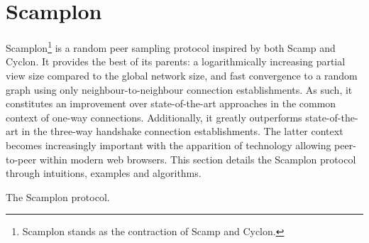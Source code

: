 
\section{Scamplon}
\label{sec:proposal}

Scamplon\footnote{Scamplon stands as the contraction of Scamp and Cyclon.} is a
random peer sampling protocol inspired by both Scamp and Cyclon. It provides
the best of its parents: a logarithmically increasing partial view size
compared to the global network size, and fast convergence to a random graph
using only neighbour-to-neighbour connection establishments. As such, it
constitutes an improvement over state-of-the-art approaches in the common
context of one-way connections. Additionally, it greatly outperforms
state-of-the-art in the three-way handshake connection establishments. The
latter context becomes increasingly important with the apparition of technology
allowing peer-to-peer within modern web browsers. This section details the
Scamplon protocol through intuitions, examples and algorithms.

\begin{algorithm}
  
  \caption{\label{algo:scamplon}The Scamplon protocol.}
\end{algorithm}

